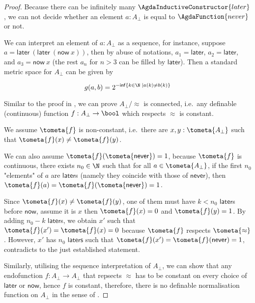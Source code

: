 \begin{proof}
Because there can be infinitely many  $\AgdaInductiveConstructor{later}$, we can not decide whether an element $a : A_{\bot}$ is equal to $\AgdaFunction{never}$ or not.

We can interpret an element of $a : A_{\bot}$ as a sequence, for instance, suppose $a = \mathsf{later} ~ (\mathsf{later} ~ (\mathsf{now}~x))$, then by abuse of notations, $a_1 =  \mathsf{later}$, $a_2 =  \mathsf{later}$, and $a_3 =  \mathsf{now}~x$ (the rest $a_n$ for $n >3$ can be filled by $\mathsf{later}$). Then a standard metric space for $A_{\bot}$ can be given by

\begin{equation}
g(a,b) = 2^{-\mathsf{inf}\{k \in \N \; | a(k) \not= b(k)\}}
\end{equation}

Similar to the proof in , we can prove $A_{\bot}/\approx$ is connected, i.e.\ any definable (continuous) function $f : A_{\bot} \to \bool$ which respects $\approx$ is constant.


We assume $\tometa{f}$ is non-constant, i.e.\ there are $x , y : \tometa {A_{\bot}}$ such that $\tometa{f}(x) \not= \tometa{f}(y)$.

We can also assume $\tometa{f}(\tometa{\mathsf{never}}) = 1$, because $\tometa{f}$ is continuous, there exists $n_0 \in \N$ such that for all $a \in \tometa {A_{\bot}}$, if the first $n_0$ "elements" of $a$ are $\mathsf{later}$s (namely they coincide with those of $\mathsf{never}$), then $\tometa{f}(a) = \tometa{f}(\tometa{\mathsf{never}}) = 1$.

Since $\tometa{f}(x) \not= \tometa{f}(y)$, one of them must have $k < n_0$ $\mathsf{later}$s before $\mathsf{now}$, assume it is $x$ then $\tometa{f}(x) = 0$ and $\tometa{f}(y) = 1$. By adding $n_0 - k$  $\mathsf{later}$s, we obtain $x'$ such that $\tometa{f}(x') = \tometa{f}(x) = 0$ because $\tometa{f}$ respects $\tometa{\approx}$. However, $x'$ has $n_0$ $\mathsf{laters}$ such that $\tometa{f}(x') = \tometa{f}(\mathsf{never}) = 1$, contradicts to the just established statement.

Similarly, utilising the sequence interpretation of $A_{\bot}$, we can show that any endofunction $f : A_{\bot} \to A_{\bot}$ that repsects $\approx$ has to be constant on every choice of $\mathsf{later}$ or $\mathsf{now}$, hence $f$ is constant, therefore, there is no definable  normalisation function on $A_\bot$ in the sense of .
\end{proof}


